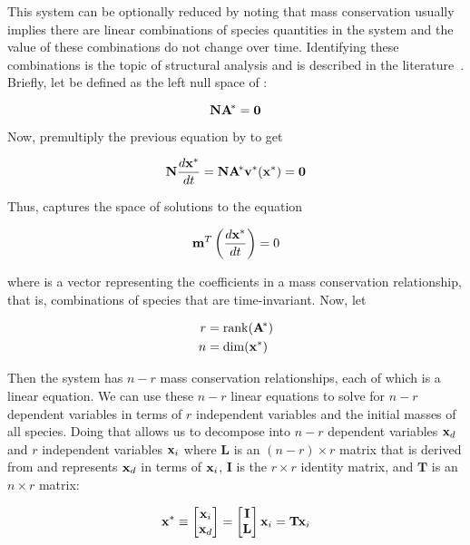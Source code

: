 This system can be optionally reduced by noting that mass
conservation usually implies there are linear combinations of
species quantities in the system and the value of these
combinations do not change over time.  Identifying these
combinations is the topic of structural analysis and is described
in the literature~\citep{reder_1988,sauro_2003}.  Briefly, let \bN
be defined as the left null space of \As:
\begin{linenomath}
\begin{equation*}
  \mathbf{N} \mathbf{A}^{\!*} = \mathbf{0}
\end{equation*}
\end{linenomath}
Now, premultiply the previous equation by \bN to get
\begin{linenomath}
\begin{equation*}
    \mathbf{N} \dfrac{d\mathbf{x}^*}{dt} = \mathbf{N} \mathbf{A}^{\!*} \mathbf{v}^* (\mathbf{x}^*) = \mathbf{0}
\end{equation*}
\end{linenomath}
Thus, \bN captures the space of solutions to the equation
\begin{linenomath}
\begin{equation*}
  \mathbf{m}^T \left( \frac{d\mathbf{x}^*}{dt} \right) = 0
\end{equation*}
\end{linenomath}
where \bm is a vector representing the coefficients in a mass
conservation relationship, that is, combinations of species that
are time-invariant.  Now, let
\begin{linenomath}
\begin{align*}
  r &= \operatorname{rank}(\mathbf{A}^{\!*})\\
  n &= \operatorname{dim}(\mathbf{x}^*)
\end{align*}
\end{linenomath}
Then the system has $n - r$ mass conservation relationships, each
of which is a linear equation.  We can use these $n - r$ linear
equations to solve for $n - r$ dependent variables in terms of $r$
independent variables and the initial masses of all species.
Doing that allows us to decompose \xs into $n - r$ dependent
variables $\mathbf{x}_d$ and $r$ independent variables $\mathbf{x}_i$
where $\mathbf{L}$ is an $(n - r) \times r$ matrix that is derived
from \bN and represents $\mathbf{x}_d$ in terms of $\mathbf{x}_i$,
$\mathbf{I}$ is the $r \times r$ identity matrix, and $\mathbf{T}$
is an $n \times r$ matrix:
\begin{linenomath}
\begin{equation*}
  \mathbf{x}^* \equiv \begin{bmatrix} \mathbf{x}_i \\ \mathbf{x}_d \end{bmatrix}
  = \begin{bmatrix} \mathbf{I} \\ \mathbf{L} \end{bmatrix} \mathbf{x}_i
  = \mathbf{T} \mathbf{x}_i
\end{equation*}
\end{linenomath}
